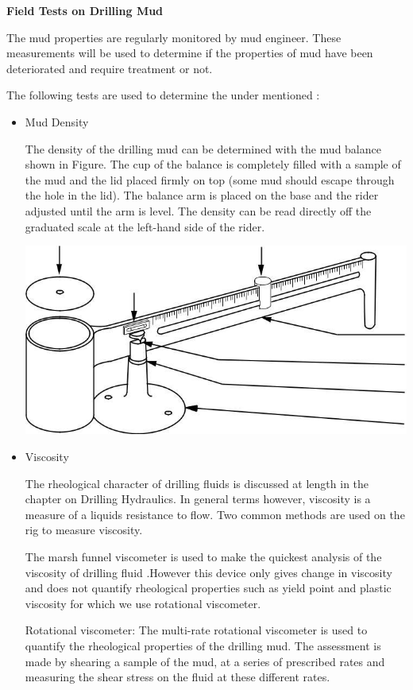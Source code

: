 \noindent \textbf{Field Tests on Drilling Mud}

The mud properties are regularly monitored by mud engineer. These measurements 
will be used to determine if the properties of mud have been deteriorated and 
require treatment or not.

The following tests are used to determine the under mentioned :
\begin{itemize}

\item Mud Density

The density of the drilling mud can be determined with the mud balance shown 
in Figure. The cup of the balance is completely filled with a sample of the
mud and the lid placed firmly on top (some mud should escape through the hole 
in the lid). The balance arm is placed on the base and the rider adjusted until 
the arm is level. The density can be read directly off the graduated scale at 
the left-hand side of the rider.


\includegraphics[scale=0.3]{images/mudbalance}


\item Viscosity

The rheological character of drilling fluids is discussed at length in the 
chapter on Drilling Hydraulics. In general terms however, viscosity is a 
measure of a liquids resistance to flow. Two common methods are used on the rig 
to measure viscosity.

The marsh funnel viscometer is used to make the quickest analysis of the 
viscosity of drilling fluid .However this device only gives change in 
viscosity and does not quantify rheological properties such as yield point 
and plastic viscosity for which we use rotational viscometer.

Rotational viscometer: The multi-rate rotational viscometer is used
to quantify the rheological properties of the drilling mud. The
assessment is made by shearing a sample of the mud, at a series of
prescribed rates and measuring the shear stress on the fluid at these
different rates.


\end{itemize}
